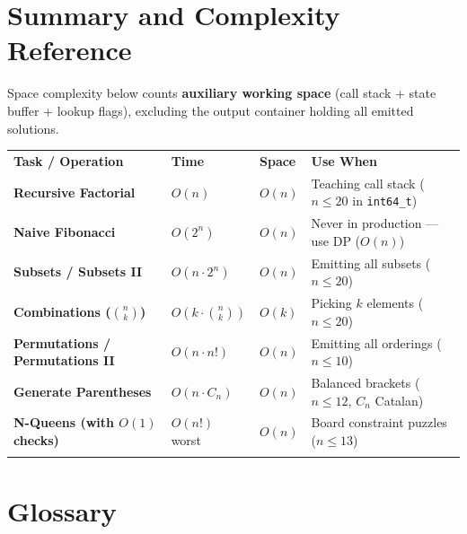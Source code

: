 \documentclass[11pt,a4paper]{article}
\theoremstyle{definition}
\begin{document}
\section{Summary and Complexity Reference}

Space complexity below counts \textbf{auxiliary working space} (call stack + state buffer + lookup flags), excluding the output container holding all emitted solutions.

\begingroup\small{}
\begin{tabularx}{\textwidth}{>{\raggedright\arraybackslash\bfseries}p{4.1cm} >{\centering\arraybackslash}p{2.3cm} >{\centering\arraybackslash}p{1.6cm} >{\raggedright\arraybackslash}X}
\arrayrulecolor{primaryblue}\toprule[1.2pt]
\rowcolor{primaryblue!10}
\textcolor{primaryblue}{\textbf{Task / Operation}} & \textcolor{primaryblue}{\textbf{Time}} & \textcolor{primaryblue}{\textbf{Space}} & \textcolor{primaryblue}{\textbf{Use When}} \\
\arrayrulecolor{codeframe}\midrule[0.6pt]
Recursive Factorial & $O(n)$ & $O(n)$ & Teaching call stack ($n \le 20$ in \texttt{int64\_t}) \\
Naive Fibonacci & $O(2^n)$ & $O(n)$ & Never in production --- use DP ($O(n)$) \\
Subsets / Subsets II & $O(n \cdot 2^n)$ & $O(n)$ & Emitting all subsets ($n \le 20$) \\
Combinations ($\binom{n}{k}$) & $O(k \cdot \binom{n}{k})$ & $O(k)$ & Picking $k$ elements ($n \le 20$) \\
Permutations / Permutations II & $O(n \cdot n!)$ & $O(n)$ & Emitting all orderings ($n \le 10$) \\
Generate Parentheses & $O(n \cdot C_n)$ & $O(n)$ & Balanced brackets ($n \le 12$, $C_n$ Catalan) \\
N-Queens (with $O(1)$ checks) & $O(n!)$ worst & $O(n)$ & Board constraint puzzles ($n \le 13$) \\
\arrayrulecolor{primaryblue}\bottomrule[1.2pt]
\end{tabularx}\endgroup

\section{Glossary}
\end{document}

